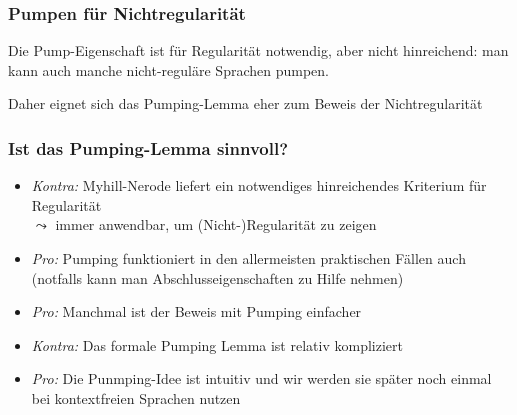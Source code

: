 \documentclass[onlymath]{beamer}
\begin{document}
\begin{frame}[t]\frametitle{Pumpen für Nichtregularität}

Die Pump-Eigenschaft ist für Regularität \alert{notwendig}, aber \alert{nicht hinreichend}: man kann auch manche nicht-reguläre Sprachen pumpen.
\medskip

Daher eignet sich das Pumping-Lemma eher zum Beweis der Nichtregularität
\medskip\pause


\end{frame}


\begin{frame}\frametitle{Ist das Pumping-Lemma sinnvoll?}

\begin{itemize}
\item \emph{Kontra:} Myhill-Nerode liefert ein notwendiges  hinreichendes Kriterium für Regularität\\
$\leadsto$ immer anwendbar, um (Nicht-)Regularität zu zeigen
\item \emph{Pro:} Pumping funktioniert in den allermeisten praktischen Fällen auch\\
(notfalls kann man Abschlusseigenschaften zu Hilfe nehmen)
\item \emph{Pro:} Manchmal ist der Beweis mit Pumping einfacher
\item \emph{Kontra:} Das formale Pumping Lemma ist relativ kompliziert
\item \emph{Pro:} Die Punmping-Idee ist intuitiv und wir werden sie später noch einmal bei kontextfreien Sprachen nutzen
\end{itemize}

\end{frame}


\end{document}
